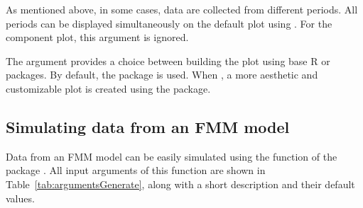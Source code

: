 As mentioned above, in some cases, data are collected from different periods. All periods can be displayed simultaneously on the default plot using . For the component plot, this argument is ignored.

The argument  provides a choice between building the plot using base R  or  packages. By default, the  package is used. When , a more aesthetic and customizable plot is created using the  package. 

\subsection{Simulating data from an FMM model}\label{subsec:impl:FMMSimulate}
Data from an FMM model can be easily simulated using the function  of the package . All input arguments of this function are shown in Table~\ref{tab:argumentsGenerate}, along with a short description and their default values. 

